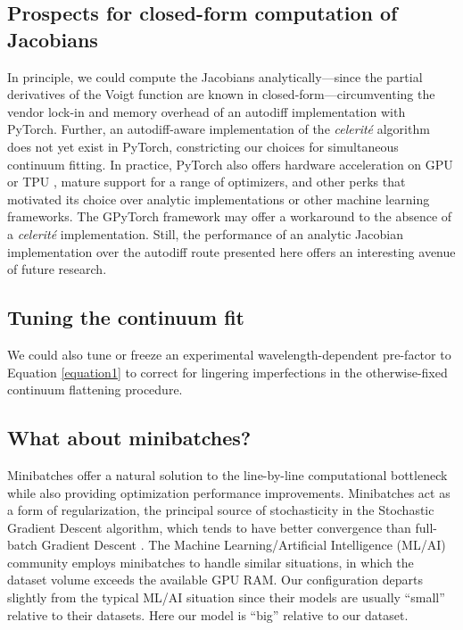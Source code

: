 \documentclass[modern]{aastex631}
\begin{document}
\subsection{Prospects for closed-form computation of Jacobians}
In principle, we could compute the Jacobians analytically---since the partial derivatives of the Voigt function are known in closed-form---circumventing the vendor lock-in and memory overhead of an autodiff implementation with PyTorch. Further, an autodiff-aware implementation of the \emph{celerit\'e} algorithm \citep{2017AJ....154..220F} does not yet exist in PyTorch, constricting our choices for simultaneous continuum fitting. In practice, PyTorch also offers hardware acceleration on GPU or TPU \citep{10.1145/3079856.3080246}, mature support for a range of optimizers, and other perks that motivated its choice over analytic implementations or other machine learning frameworks. The GPyTorch framework \citep{2018arXiv180911165G} may offer a workaround to the absence of a \emph{celerit\'e} implementation. Still, the performance of an analytic Jacobian implementation over the autodiff route presented here offers an interesting avenue of future research.


\subsection{Tuning the continuum fit}
We could also tune or freeze an experimental wavelength-dependent pre-factor to Equation \ref{equation1} to correct for lingering imperfections in the otherwise-fixed continuum flattening procedure.


\subsection{What about minibatches?}

Minibatches offer a natural solution to the line-by-line computational bottleneck while also providing optimization performance improvements. Minibatches act as a form of regularization, the principal source of stochasticity in the Stochastic Gradient Descent algorithm, which tends to have better convergence than full-batch Gradient Descent \citep{2016arXiv160904747R}. The Machine Learning/Artificial Intelligence (ML/AI) community employs minibatches to handle similar situations, in which the dataset volume exceeds the available GPU RAM. Our configuration departs slightly from the typical ML/AI situation since their models are usually ``small'' relative to their datasets. Here our model is ``big'' relative to our dataset.
\end{document}
